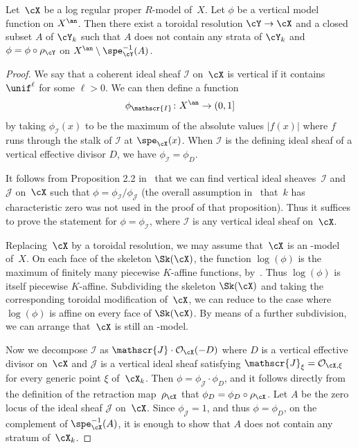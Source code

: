 \begin{prop}\label{prop:adapted}
Let~$\cX$ be a log regular proper $R$\nobreakdash-model of~$X$. Let $\phi$ be a vertical model function on $X^{\an}$. Then there exist a toroidal resolution $\cY\to \cX$ and a closed subset $A$ of $\cY_k$ such that $A$ does not contain any strata of $\cY_k$ and $\phi=\phi\circ \rho_{\cY}$ on $X^{\an}\setminus \spe^{-1}_{\cY}(A)$.
\end{prop}
\begin{proof}
We say that a coherent ideal sheaf $\mathscr{I}$ on~$\cX$ is vertical if it contains $\unif^\ell$ for some $\ell>0$. We can then define a function
\[
\phi_{\mathscr{I}}\colon X^{\an}\to (0,1]
\]
by taking $\phi_{\mathscr{I}}(x)$ to be the maximum of the absolute values $|f(x)|$ where $f$ runs through the stalk of $\mathscr{I}$ at $\spe_{\cX}(x)$. When $\mathscr{I}$ is the defining ideal sheaf of a vertical effective divisor $D$, we have $\phi_{\mathscr{I}}=\phi_D$.

It follows from Proposition 2.2 in~\cite{BFJ16} that we can find vertical ideal sheaves~$\mathscr{I}$ and $\mathscr{J}$ on~$\cX$ such that $\phi=\phi_{\mathscr{I}}/\phi_{\mathscr{J}}$ (the overall assumption in~\cite{BFJ16} that~$k$ has characteristic zero was not used in the proof of that proposition). Thus it suffices to prove the statement for $\phi=\phi_{\mathscr{I}}$, where $\mathscr{I}$ is any vertical ideal sheaf on~$\cX$.

Replacing~$\cX$ by a toroidal resolution, we may assume that~$\cX$ is an \snc-model of~$X$.
On each face of the skeleton $\Sk(\cX)$, the function $\log(\phi)$ is the maximum of finitely many piecewise $K$\nobreakdash-affine functions, by~\cite[3.2.2]{MuNi}. Thus $\log(\phi)$ is itself piecewise $K$\nobreakdash-affine. Subdividing the skeleton $\Sk(\cX)$ and taking the corresponding toroidal modification of~$\cX$, we can reduce to the case where $\log(\phi)$ is affine on every face of $\Sk(\cX)$. By means of a further subdivision, we can arrange that~$\cX$ is still an \snc-model.

Now we decompose $\mathscr{I}$ as $\mathscr{J}\cdot \mathcal{O}_{\cX}(-D)$ where $D$ is a vertical effective divisor on~$\cX$ and $\mathscr{J}$ is a vertical ideal sheaf
satisfying $\mathscr{J}_{\xi}=\mathcal{O}_{\cX,\xi}$ for every generic point $\xi$ of~$\cX_k$. Then $\phi=\phi_{\mathscr{J}}\cdot \phi_D$, and it follows directly from the definition of the retraction map~$\rho_{\cX}$ that $\phi_D=\phi_D\circ \rho_{\cX}$. Let $A$ be the zero locus of the ideal sheaf $\mathscr{J}$ on~$\cX$. Since $\phi_{\mathscr{J}}=1$, and thus $\phi=\phi_D$, on the complement of $\spe^{-1}_{\cX}(A)$, it is enough to show that $A$ does not contain any stratum of~$\cX_k$.


\end{proof}
